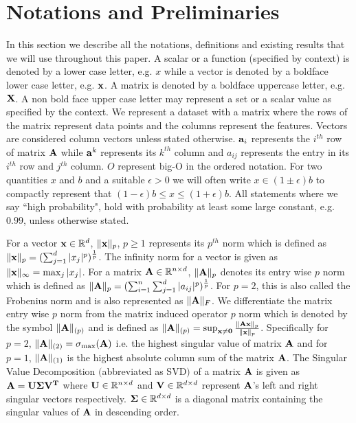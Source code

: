 \section{Notations and Preliminaries}
In this section we describe all the notations, definitions and existing results that we will use throughout this paper. 
A scalar or a function (specified by context) is denoted by a lower case letter, e.g. $x$ while a vector is denoted by a boldface lower case letter, e.g. $\mathbf{x}$. 
A matrix is denoted by a boldface  uppercase letter, e.g. $\mathbf{X}$.
A non bold face upper case letter may represent a set or a scalar value as specified by the context.
We represent a dataset with a matrix where the rows of the matrix represent data points and the columns represent the features.
Vectors are considered column vectors unless stated otherwise.
$\mathbf{a}_i$ represents the $i^{th}$ row of matrix $\mathbf{A}$ while $\mathbf{a}^k$ represents its $k^{th}$ column and $a_{ij}$ represents the entry in its $i^{th}$ row and $j^{th}$ column.
$O$ represent big-O in the ordered notation. For two quantities $x$ and $b$ and a suitable $\epsilon > 0$ we will often write $x \in (1 \pm \epsilon) b$ to compactly represent that $ (1 - \epsilon)b \le x \le (1 + \epsilon) b$. All statements where we say ``high probability", hold with probability at least some large constant, e.g. $0.99$, unless otherwise stated.

For a vector $\mathbf{x} \in \mathbb{R}^d$, $\|\mathbf{x}\|_p$, $p \geq 1$ represents its $p^{th}$ norm which is defined as $\|\mathbf{x}\|_p= ({\sum_{j=1}^d|x_j|^p})^\frac{1}{p}$. 
The infinity norm for a vector  is given as $\|\mathbf{x}\|_\infty = \max_j |x_j| $. 
For a matrix $\mathbf{A} \in \mathbb{R}^{n \times d}$, $\|\mathbf{A}\|_p$ denotes its entry wise $p$ norm which is defined  as $\|\mathbf{A}\|_p = (\sum_{i=1}^n\sum_{j=1}^d |a_{ij}|^p)^{\frac{1}{p}}$. 
For $p=2$, this is also called the Frobenius norm and is also represented as $\|\mathbf{A}\|_F$. 
We differentiate the matrix entry wise $p$ norm from the matrix induced operator $p$ norm which is denoted by the symbol $\|\mathbf{A}\|_{(p)}$ and is defined as $\|\mathbf{A}\|_{(p)}= \sup_{\mathbf{x} \neq \mathbf{0}}\frac{\|\mathbf{Ax}\|_p}{\|\mathbf{x}\|_p}$. 
Specifically for $p=2$, $\|\mathbf{A}\|_{(2)} = \sigma_{\text{max}}(\mathbf{A})$ i.e. the highest singular value of matrix $\mathbf{A}$ and for $p=1$, $\|\mathbf{A}\|_{(1)}$ is the highest absolute column sum of the matrix $\mathbf{A}$. 
The Singular Value Decomposition $($abbreviated as SVD$)$ of a matrix $\mathbf{A}$ is given as $\mathbf{A}=\mathbf{U\Sigma V^T}$ where $\mathbf{U} \in \mathbb{R}^{n \times d}$ and $\mathbf{V} \in  \mathbb{R}^{d \times d}$ represent $\mathbf{A}$'s left and right singular vectors respectively. 
$\mathbf{\Sigma} \in \mathbb{R}^{d \times d}$ is a diagonal matrix containing the singular values of $\mathbf{A}$ in descending order.
%
